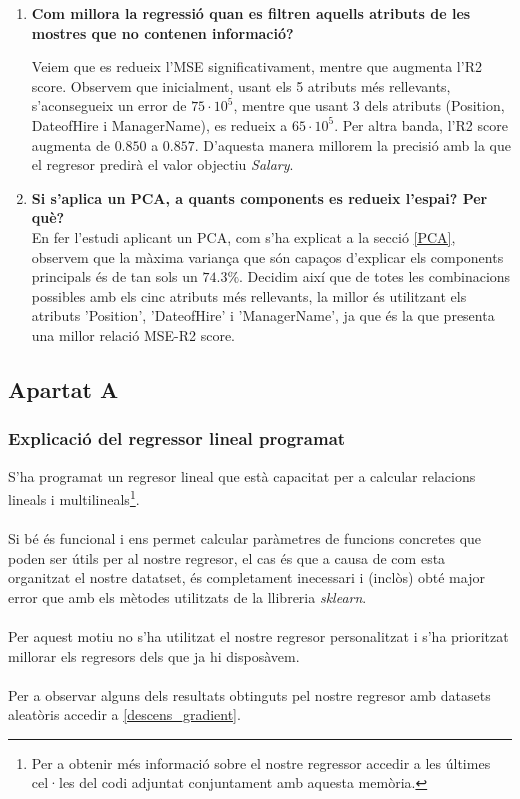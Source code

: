 \documentclass[a4paper, 11pt]{article}
\begin{document}
\begin{enumerate}
    \item \textbf{Com millora la regressió quan es filtren aquells atributs de les mostres que no contenen informació?}

    Veiem que es redueix l'MSE significativament, mentre que augmenta l'R2 score. Observem que inicialment, usant els 5 atributs més rellevants, s'aconsegueix un error de $75\cdot 10^5$, mentre que usant 3 dels atributs (Position, DateofHire i ManagerName), es redueix a $65\cdot 10^5$. Per altra banda, l'R2 score augmenta de $0.850$ a $0.857$. D'aquesta manera millorem la precisió amb la que el regresor predirà el valor objectiu \textit{Salary}.
    

    \item \textbf{Si s'aplica un PCA, a quants components es redueix l'espai? Per què?}\\
    En fer l'estudi aplicant un PCA, com s'ha explicat a la secció \textcolor{navy}{\ref{PCA}}, observem que la màxima variança que són capaços d'explicar els components principals és de tan sols un $74.3\%$. Decidim així que de totes les combinacions possibles amb els cinc atributs més rellevants, la millor és utilitzant els atributs 'Position', 'DateofHire' i 'ManagerName', ja que és la que presenta una millor relació MSE-R2 score. 

\end{enumerate}


\newpage
\subsection{Apartat A}
\subsubsection{Explicació del regressor lineal programat}
S'ha programat un regresor lineal que està capacitat per a calcular relacions lineals i multilineals\footnote{Per a obtenir més informació sobre el nostre regressor accedir a les últimes cel·les del codi adjuntat conjuntament amb aquesta memòria.}.\\\\
Si bé és funcional i ens permet calcular paràmetres de funcions concretes que poden ser útils per al nostre regresor, el cas és que a causa de com esta organitzat el nostre datatset, és completament inecessari i (inclòs) obté major error que amb els mètodes utilitzats de la llibreria \textit{sklearn}.\\\\
Per aquest motiu no s'ha utilitzat el nostre regresor personalitzat i s'ha prioritzat millorar els regresors dels que ja hi disposàvem.\\\\
Per a observar alguns dels resultats obtinguts pel nostre regresor amb datasets aleatòris accedir a \textcolor{blue}{\ref{descens_gradient}}.
\end{document}

